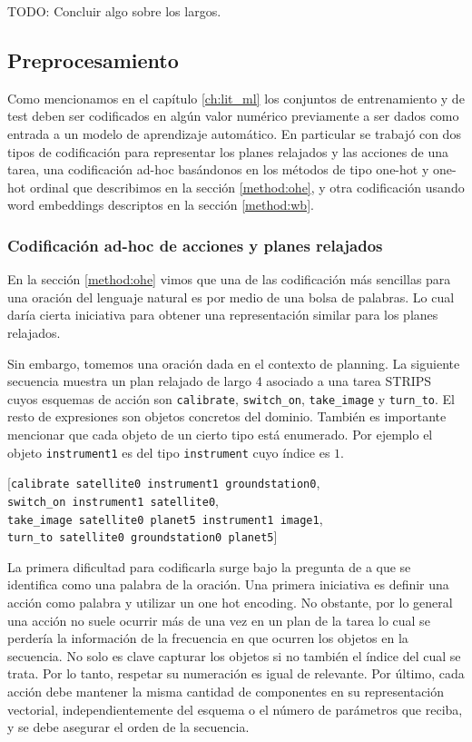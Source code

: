 TODO: Concluir algo sobre los largos.

\subsection{Preprocesamiento}

Como mencionamos en el capítulo \ref{ch:lit_ml} los conjuntos de entrenamiento y de test deben ser codificados en algún valor numérico previamente a ser dados como entrada a un modelo de aprendizaje automático. En particular se trabajó con dos tipos de codificación para representar los planes relajados y las acciones de una tarea, una codificación ad-hoc basándonos en los métodos de tipo one-hot y one-hot ordinal que describimos en la sección \ref{method:ohe}, y otra codificación usando word embeddings descriptos en la sección \ref{method:wb}.

\subsubsection{Codificación ad-hoc de acciones y planes relajados}

En la sección \ref{method:ohe} vimos que una de las codificación más sencillas para una oración del lenguaje natural es por medio de una bolsa de palabras. Lo cual daría cierta iniciativa para obtener una representación similar para los planes relajados.

Sin embargo, tomemos una oración dada en el contexto de planning. La siguiente secuencia muestra un plan relajado de largo 4 asociado a una tarea STRIPS cuyos esquemas de acción son \verb|calibrate|, \verb|switch_on|, \verb|take_image| y \verb|turn_to|. El resto de
expresiones son objetos concretos del dominio. También es importante mencionar
que cada objeto de un cierto tipo está enumerado. Por ejemplo el objeto
\verb|instrument1| es del tipo \verb|instrument| cuyo índice es $1$. 

\begin{center}
    [\verb|calibrate satellite0 instrument1 groundstation0|, \\
    \verb|switch_on instrument1 satellite0|, \\
    \verb|take_image satellite0 planet5 instrument1 image1|, \\
    \verb|turn_to satellite0 groundstation0 planet5|] \\
\end{center}

La primera dificultad para codificarla surge bajo la pregunta de a que se
identifica como una palabra de la oración. Una primera iniciativa es definir una
acción como palabra y utilizar un one hot encoding. No obstante, por lo general
una acción no suele ocurrir más de una vez en un plan de la tarea lo cual se
perdería la información de la frecuencia en que ocurren los objetos en la
secuencia. No solo es clave capturar los objetos si no también el índice del
cual se trata. Por lo tanto, respetar su numeración es igual de relevante. Por
último, cada acción debe mantener la misma cantidad de componentes en su
representación vectorial, independientemente del esquema o el número de
parámetros que reciba, y se debe asegurar el orden de la secuencia.

